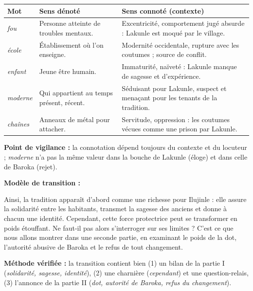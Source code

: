 \documentclass[11pt]{article}
\begin{document}
\begin{corrige}
\begin{center}
\begin{tabularx}{\linewidth}{|l|X|X|}
\hline
\rowcolor{popblueL} \textbf{Mot} & \textbf{Sens dénoté} & \textbf{Sens connoté (contexte)} \\
\hline
\emph{fou} & Personne atteinte de troubles mentaux. & Excentricité, comportement jugé absurde : Lakunle est moqué par le village. \\
\hline
\emph{école} & Établissement où l'on enseigne. & Modernité occidentale, rupture avec les coutumes ; source de conflit. \\
\hline
\emph{enfant} & Jeune être humain. & Immaturité, naïveté : Lakunle manque de sagesse et d'expérience. \\
\hline
\emph{moderne} & Qui appartient au temps présent, récent. & Séduisant pour Lakunle, suspect et menaçant pour les tenants de la tradition. \\
\hline
\emph{chaînes} & Anneaux de métal pour attacher. & Servitude, oppression : les coutumes vécues comme une prison par Lakunle. \\
\hline
\end{tabularx}
\end{center}
\textbf{Point de vigilance :} la connotation dépend toujours du contexte et du locuteur ; \emph{moderne} n'a pas la même valeur dans la bouche de Lakunle (éloge) et dans celle de Baroka (rejet).
\end{corrige}

\begin{corrige}
\textbf{Modèle de transition :}

Ainsi, la tradition apparaît d'abord comme une richesse pour Ilujinle : elle assure la solidarité entre les habitants, transmet la sagesse des anciens et donne à chacun une identité. Cependant, cette force protectrice peut se transformer en poids étouffant. Ne faut-il pas alors s'interroger sur ses limites ? C'est ce que nous allons montrer dans une seconde partie, en examinant le poids de la dot, l'autorité abusive de Baroka et le refus de tout changement.

\textbf{Méthode vérifiée :} la transition contient bien (1) un bilan de la partie I (\emph{solidarité, sagesse, identité}), (2) une charnière (\emph{cependant}) et une question-relais, (3) l'annonce de la partie II (\emph{dot, autorité de Baroka, refus du changement}).
\end{corrige}
\end{document}
